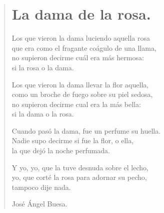 \documentclass[11pt, portrait, twoside, notitlepage, openright]{book}
\begin{document}
\newpage
\begin{verse}
\begin{center}
\section{La dama de la rosa.}
\end{center}
Los que vieron la dama luciendo aquella rosa\\
que era como el fragante coágulo de una llama,\\
no supieron decirme cuál era más hermosa:\\
si la rosa o la dama.
\newline

Los que vieron la dama llevar la flor aquella,\\
como un broche de fuego sobre su piel sedosa,\\
no supieron decirme cual era la más bella:\\
si la dama o la rosa.
\newline

Cuando pasó la dama, fue un perfume su huella.\\
Nadie supo decirme si fue la flor, o ella,\\
la que dejó la noche perfumada.
\newline

Y yo, yo, que la tuve desnuda sobre el lecho,\\
yo, que corté la rosa para adornar su pecho,\\
tampoco dije nada.
\newline

José Ángel Buesa.
\end{verse}
\end{document}
